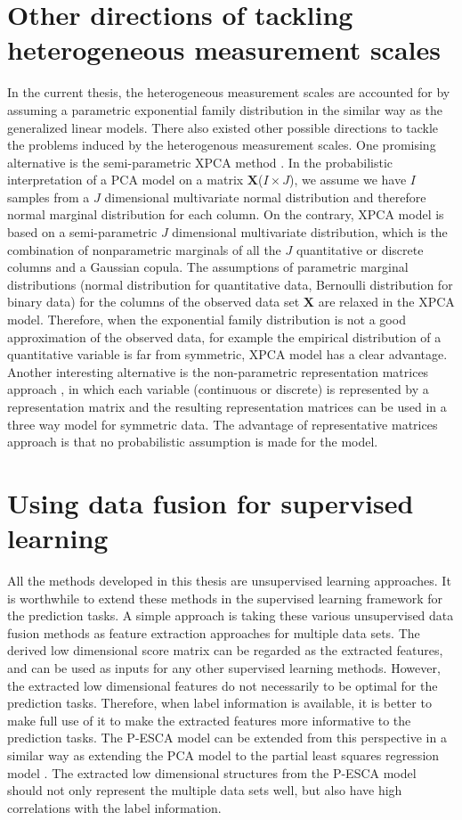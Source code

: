 \section{Other directions of tackling heterogeneous measurement scales}
In the current thesis, the heterogeneous measurement scales are accounted for by assuming a parametric exponential family distribution in the similar way as the generalized linear models. There also existed other possible directions \cite{kiers1989three, anderson2018xpca, de2009gifi} to tackle the problems induced by the heterogenous measurement scales. One promising alternative is the semi-parametric XPCA method \cite{anderson2018xpca}. In the probabilistic interpretation of a PCA model on a matrix $\mathbf{X}$($I\times J$), we assume we have $I$ samples from a $J$ dimensional multivariate normal distribution and therefore normal marginal distribution for each column. On the contrary, XPCA model is based on a semi-parametric $J$ dimensional multivariate distribution, which is the combination of nonparametric marginals of all the $J$ quantitative or discrete columns and a Gaussian copula. The assumptions of parametric marginal distributions (normal distribution for quantitative data, Bernoulli distribution for binary data) for the columns of the observed data set $\mathbf{X}$ are relaxed in the XPCA model. Therefore, when the exponential family distribution is not a good approximation of the observed data, for example the empirical distribution of a quantitative variable is far from symmetric, XPCA model has a clear advantage. Another interesting alternative is the non-parametric representation matrices approach \cite{kiers1989three}, in which each variable (continuous or discrete) is represented by a representation matrix and the resulting representation matrices can be used in a three way model for symmetric data. The advantage of representative matrices approach is that no probabilistic assumption is made for the model.

\section{Using data fusion for supervised learning}
All the methods developed in this thesis are unsupervised learning approaches. It is worthwhile to extend these methods in the supervised learning framework for the prediction tasks. A simple approach is taking these various unsupervised data fusion methods as feature extraction approaches for multiple data sets. The derived low dimensional score matrix can be regarded as the extracted features, and can be used as inputs for any other supervised learning methods. However, the extracted low dimensional features do not necessarily to be optimal for the prediction tasks. Therefore, when label information is available, it is better to make full use of it to make the extracted features more informative to the prediction tasks. The P-ESCA model can be extended from this perspective in a similar way as extending the PCA model to the partial least squares regression model \cite{geladi1986partial}. The extracted low dimensional structures from the P-ESCA model should not only represent the multiple data sets well, but also have high correlations with the label information.

